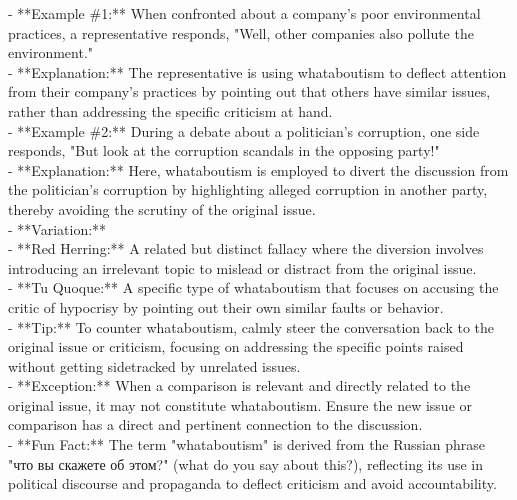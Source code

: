 \documentclass[a4paper,12pt,single,pdftex]{scrbook}
\begin{document}
    
      - **Example \#1:** When confronted about a company's poor environmental practices, a representative responds, "Well, other companies also pollute the environment."
    \\

    
      - **Explanation:** The representative is using whataboutism to deflect attention from their company’s practices by pointing out that others have similar issues, rather than addressing the specific criticism at hand.
    \\

    
      - **Example \#2:** During a debate about a politician's corruption, one side responds, "But look at the corruption scandals in the opposing party!"
    \\

    
      - **Explanation:** Here, whataboutism is employed to divert the discussion from the politician's corruption by highlighting alleged corruption in another party, thereby avoiding the scrutiny of the original issue.
    \\

    
      - **Variation:**
    \\

    
        - **Red Herring:** A related but distinct fallacy where the diversion involves introducing an irrelevant topic to mislead or distract from the original issue.
    \\

    
        - **Tu Quoque:** A specific type of whataboutism that focuses on accusing the critic of hypocrisy by pointing out their own similar faults or behavior.
    \\

    
      - **Tip:** To counter whataboutism, calmly steer the conversation back to the original issue or criticism, focusing on addressing the specific points raised without getting sidetracked by unrelated issues.
    \\

    
      - **Exception:** When a comparison is relevant and directly related to the original issue, it may not constitute whataboutism. Ensure the new issue or comparison has a direct and pertinent connection to the discussion.
    \\

    
      - **Fun Fact:** The term "whataboutism" is derived from the Russian phrase "что вы скажете об этом?" (what do you say about this?), reflecting its use in political discourse and propaganda to deflect criticism and avoid accountability.
    \\
\end{document}
